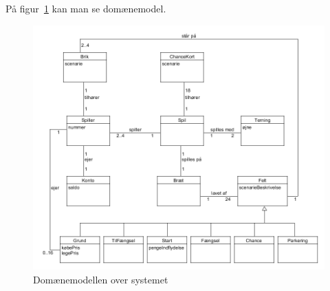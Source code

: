 \documentclass[class=article, crop=false]{standalone}
\begin{document}
    På figur~\ref{fig:domain_model} kan man se domænemodel.
    \begin{figure}[H]
        \centering

        \includegraphics[scale = 0.2]{diagrams_png/domain_model.png}
        \caption{Domænemodellen over systemet}\label{fig:domain_model}
    \end{figure}
\end{document}
